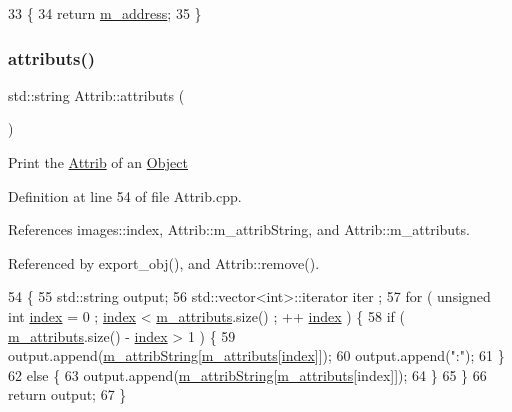 \begin{DoxyCode}
33                                       \{
34     \textcolor{keywordflow}{return} \hyperlink{classSpecsInterface_a4064da5ca6e0a172363967c4acc0b365}{m\_address};
35 \}
\end{DoxyCode}
\mbox{\label{classAttrib_aee7bbf16b144887f196e1341b24f8a26}} 
\subsubsection{\texorpdfstring{attributs()}{attributs()}}
{\footnotesize\ttfamily std\+::string Attrib\+::attributs (\begin{DoxyParamCaption}{ }\end{DoxyParamCaption})\hspace{0.3cm}{\ttfamily [inherited]}}

Print the \hyperlink{classAttrib}{Attrib} of an \hyperlink{classObject}{Object} 

Definition at line 54 of file Attrib.\+cpp.



References images\+::index, Attrib\+::m\+\_\+attrib\+String, and Attrib\+::m\+\_\+attributs.



Referenced by export\+\_\+obj(), and Attrib\+::remove().


\begin{DoxyCode}
54                             \{
55   std::string output;
56   std::vector<int>::iterator iter ;
57   \textcolor{keywordflow}{for} ( \textcolor{keywordtype}{unsigned} \textcolor{keywordtype}{int} \hyperlink{namespaceimages_a54407fd574970b3178647ae096321a57}{index} = 0 ; \hyperlink{namespaceimages_a54407fd574970b3178647ae096321a57}{index} < \hyperlink{classAttrib_ac4bd58a0cc6b38a3b711d609a3d3aacc}{m\_attributs}.size() ; ++
      \hyperlink{namespaceimages_a54407fd574970b3178647ae096321a57}{index} ) \{
58     \textcolor{keywordflow}{if} ( \hyperlink{classAttrib_ac4bd58a0cc6b38a3b711d609a3d3aacc}{m\_attributs}.size() - \hyperlink{namespaceimages_a54407fd574970b3178647ae096321a57}{index} > 1 ) \{
59       output.append(\hyperlink{classAttrib_a3414521d7a82476e874b25a5407b5e63}{m\_attribString}[\hyperlink{classAttrib_ac4bd58a0cc6b38a3b711d609a3d3aacc}{m\_attributs}[\hyperlink{namespaceimages_a54407fd574970b3178647ae096321a57}{index}]]);
60       output.append(\textcolor{stringliteral}{":"});
61     \}
62     \textcolor{keywordflow}{else} \{
63       output.append(\hyperlink{classAttrib_a3414521d7a82476e874b25a5407b5e63}{m\_attribString}[\hyperlink{classAttrib_ac4bd58a0cc6b38a3b711d609a3d3aacc}{m\_attributs}[index]]);
64     \}
65   \}
66   \textcolor{keywordflow}{return} output;
67 \}
\end{DoxyCode}
\mbox{\label{classHierarchy_a1e207f973c694b538bf90107b4868817}} 
